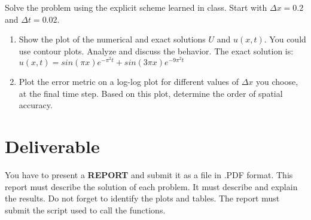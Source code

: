 \documentclass{article}
\begin{document}
Solve the problem using the explicit scheme learned in class. Start with $\Delta x = 0.2$ and $\Delta t = 0.02$.

\begin{enumerate}
	\item Show the plot of the numerical and exact solutions $U$ and $u(x,t)$. You could use contour plots. Analyze and discuss the behavior. The exact solution is: 
	$u(x,t) = sin(\pi x)e^{-\pi^2t} + sin(3\pi x)e^{-9\pi^2t} $
	\item Plot the error metric on a log-log plot for different values of $\Delta x$ you choose, at the final time step. Based on this plot, determine the order of spatial accuracy.
\end{enumerate}

\pagebreak

%
%
%



\section*{Deliverable}
You have to present a \textbf{REPORT} and submit it as a file in .PDF format. This report must describe the solution of each problem. It must describe and explain the results. Do not forget to identify the plots and tables. The report must submit the script used to call the functions.\\
\end{document}
